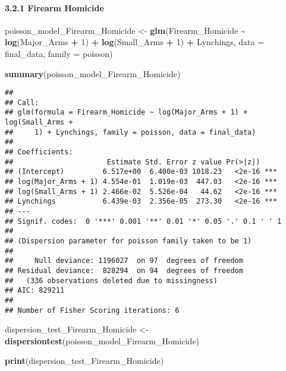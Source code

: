 \documentclass[
  11pt,
]{article}
\newenvironment{Shaded}{\begin{snugshade}}{\end{snugshade}}
\newcommand{\AttributeTok}[1]{\textcolor[rgb]{0.13,0.29,0.53}{#1}}
\newcommand{\DecValTok}[1]{\textcolor[rgb]{0.00,0.00,0.81}{#1}}
\newcommand{\FunctionTok}[1]{\textcolor[rgb]{0.13,0.29,0.53}{\textbf{#1}}}
\newcommand{\NormalTok}[1]{#1}
\newcommand{\OtherTok}[1]{\textcolor[rgb]{0.56,0.35,0.01}{#1}}
\newcommand{\SpecialCharTok}[1]{\textcolor[rgb]{0.81,0.36,0.00}{\textbf{#1}}}
\begin{document}
\paragraph{3.2.1 Firearm Homicide}\label{firearm-homicide}

\begin{Shaded}
\begin{Highlighting}[]
\NormalTok{poisson\_model\_Firearm\_Homicide }\OtherTok{\textless{}{-}} \FunctionTok{glm}\NormalTok{(Firearm\_Homicide }\SpecialCharTok{\textasciitilde{}} \FunctionTok{log}\NormalTok{(Major\_Arms }\SpecialCharTok{+} \DecValTok{1}\NormalTok{) }\SpecialCharTok{+} \FunctionTok{log}\NormalTok{(Small\_Arms }\SpecialCharTok{+} \DecValTok{1}\NormalTok{) }\SpecialCharTok{+}\NormalTok{ Lynchings,                                         }\AttributeTok{data =}\NormalTok{ final\_data, }\AttributeTok{family =}\NormalTok{ poisson)}

\FunctionTok{summary}\NormalTok{(poisson\_model\_Firearm\_Homicide)  }
\end{Highlighting}
\end{Shaded}

\begin{verbatim}
## 
## Call:
## glm(formula = Firearm_Homicide ~ log(Major_Arms + 1) + log(Small_Arms + 
##     1) + Lynchings, family = poisson, data = final_data)
## 
## Coefficients:
##                      Estimate Std. Error z value Pr(>|z|)    
## (Intercept)         6.517e+00  6.400e-03 1018.23   <2e-16 ***
## log(Major_Arms + 1) 4.554e-01  1.019e-03  447.03   <2e-16 ***
## log(Small_Arms + 1) 2.466e-02  5.526e-04   44.62   <2e-16 ***
## Lynchings           6.439e-03  2.356e-05  273.30   <2e-16 ***
## ---
## Signif. codes:  0 '***' 0.001 '**' 0.01 '*' 0.05 '.' 0.1 ' ' 1
## 
## (Dispersion parameter for poisson family taken to be 1)
## 
##     Null deviance: 1196027  on 97  degrees of freedom
## Residual deviance:  828294  on 94  degrees of freedom
##   (336 observations deleted due to missingness)
## AIC: 829211
## 
## Number of Fisher Scoring iterations: 6
\end{verbatim}

\begin{Shaded}
\begin{Highlighting}[]
\NormalTok{dispersion\_test\_Firearm\_Homicide }\OtherTok{\textless{}{-}} \FunctionTok{dispersiontest}\NormalTok{(poisson\_model\_Firearm\_Homicide)}

\FunctionTok{print}\NormalTok{(dispersion\_test\_Firearm\_Homicide)  }
\end{Highlighting}
\end{Shaded}
\end{document}
